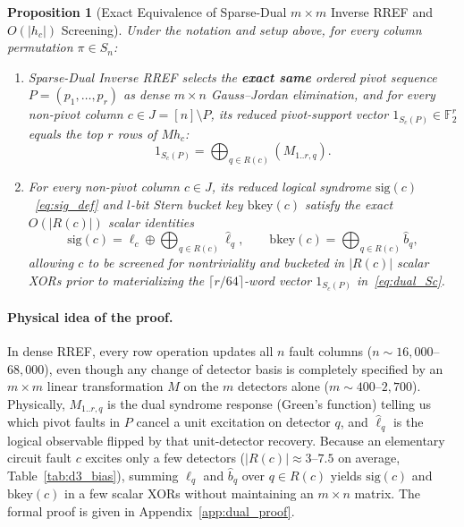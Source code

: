 \documentclass[12pt]{article}
\newtheorem{proposition}{Proposition}
\theoremstyle{definition}
\newcommand{\Ftwo}{\mathbb{F}_2}
\begin{document}
\begin{proposition}[Exact Equivalence of Sparse-Dual $m \times m$ Inverse RREF and $O(|h_c|)$
  Screening]\label{prop:sparse_dual}
Under the notation and setup above, for every column permutation $\pi \in S_n$:
\begin{enumerate}[label=(\alph*)]
  \item Sparse-Dual Inverse RREF selects the \textbf{exact same} ordered pivot sequence $P = (p_1, \dots, p_r)$ as
    dense $m \times n$ Gauss--Jordan elimination, and for every non-pivot column $c \in J = [n] \setminus P$, its
    reduced pivot-support vector $1_{S_c(P)} \in \Ftwo^r$ equals the top $r$ rows of $M h_c$:
    \begin{equation}\label{eq:dual_Sc}
      1_{S_c(P)} = \bigoplus_{q \in R(c)} (M_{1..r, q}).
    \end{equation}
  \item For every non-pivot column $c \in J$, its reduced logical syndrome $\mathrm{sig}(c)$~\eqref{eq:sig_def} and
    $l$-bit Stern bucket key $\mathrm{bkey}(c)$ satisfy the exact $O(|R(c)|)$ scalar identities
    \begin{equation}\label{eq:dual_screening}
      \mathrm{sig}(c) = \ell_c \oplus \bigoplus_{q \in R(c)} \hat{\ell}_q, \qquad
      \mathrm{bkey}(c) = \bigoplus_{q \in R(c)} \hat{b}_q,
    \end{equation}
    allowing $c$ to be screened for nontriviality and bucketed in $|R(c)|$ scalar XORs prior to materializing the
    $\lceil r/64 \rceil$-word vector $1_{S_c(P)}$ in~\eqref{eq:dual_Sc}.
\end{enumerate}
\end{proposition}

\paragraph{Physical idea of the proof.}
In dense RREF, every row operation updates all $n$ fault columns ($n \sim 16{,}000$--$68{,}000$), even though any
change of detector basis is completely specified by an $m \times m$ linear transformation $M$ on the $m$ detectors
alone ($m \sim 400$--$2{,}700$). Physically, $M_{1..r, q}$ is the dual syndrome response (Green's function) telling
us which pivot faults in $P$ cancel a unit excitation on detector $q$, and $\hat{\ell}_q$ is the logical observable
flipped by that unit-detector recovery. Because an elementary circuit fault $c$ excites only a few detectors
($|R(c)| \approx 3$--$7.5$ on average, Table~\ref{tab:d3_bias}), summing $\hat{\ell}_q$ and $\hat{b}_q$ over $q \in
R(c)$ yields $\mathrm{sig}(c)$ and $\mathrm{bkey}(c)$
in a few scalar XORs without maintaining an $m \times n$ matrix. The formal proof is given in
Appendix~\ref{app:dual_proof}.
\end{document}
